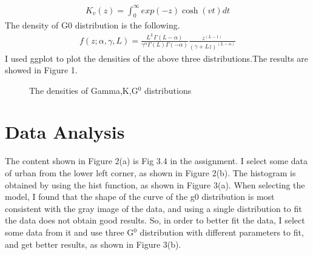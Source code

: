 \documentclass{article}
\begin{document}
\begin{eqnarray}
K_{v}(z)=\int_{0}^\infty{exp(-z)\cosh(vt)dt}
\end{eqnarray}
The density of G0 distribution is the following.
\begin{eqnarray}
f(z;\alpha,\gamma,L)=\frac{L^L\Gamma(L-\alpha)}{\gamma^\alpha\Gamma(L)\Gamma(-\alpha)}\frac{z^(L-1)}{(\gamma+Lz)^(L-\alpha)}
\end{eqnarray}
I used ggplot to plot the densities of the above three distributions.The results are showed in Figure 1. 
\begin{figure}[htbp]
\centering
{}%
%
%
\centering
\caption{The densities of Gamma,K,G$^0$ distributions}
\end{figure}
\section{Data Analysis}
The content shown in Figure 2(a) is Fig 3.4 in the assignment. I select some data of urban from the lower left corner, as shown in Figure 2(b). The histogram is obtained by using the hist function, as shown in Figure 3(a). When selecting the model, I found that the shape of the curve of the g0 distribution is most consistent with the gray image of the data, and using a single distribution to fit the data does not obtain good results. So, in order to better fit the data, I select some data from it and use three G$^0$ distribution with different parameters to fit, and get better results, as shown in Figure 3(b).\\
\end{document}

